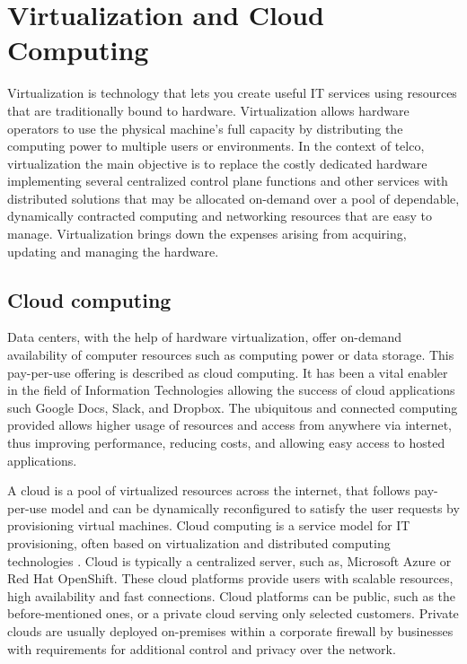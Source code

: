 \chapter{Virtualization and Cloud Computing}
\label{chapter:cloudcomputing}


Virtualization is technology that lets you create useful IT services using resources that are traditionally bound to hardware. Virtualization allows hardware operators to use the physical machine's full capacity by distributing the computing power to multiple users or environments. \cite{RedHat} In the context of telco, virtualization the main objective is to replace the costly dedicated hardware implementing several centralized control plane functions and other services with distributed solutions that may be allocated on-demand over a pool of dependable, dynamically contracted computing and networking resources that are easy to manage. \cite{Bosch2011} Virtualization brings down the expenses arising from acquiring, updating and managing the hardware. 

\section{Cloud computing}

Data centers, with the help of hardware virtualization, offer on-demand availability of computer resources such as computing power or data storage. This pay-per-use offering is described as cloud computing. It has been a vital enabler in the field of Information Technologies allowing the success of cloud applications such Google Docs, Slack, and Dropbox. The ubiquitous and connected computing provided allows higher usage of resources and access from anywhere via internet, thus improving performance, reducing costs, and allowing easy access to hosted applications.

A cloud is a pool of virtualized resources across the internet, that follows pay-per-use model and can be dynamically reconfigured to satisfy the user requests by provisioning virtual machines. Cloud computing is a service model for IT provisioning, often based on virtualization and distributed computing technologies \cite{Lombardi2011}. Cloud is typically a centralized server, such as, Microsoft Azure or Red Hat OpenShift. These cloud platforms provide users with scalable resources, high availability and fast connections. Cloud platforms can be public, such as the before-mentioned ones, or a private cloud serving only selected customers. Private clouds are usually deployed on-premises within a corporate firewall by businesses with requirements for additional control and privacy over the network. \cite{MicrosoftAzure}

